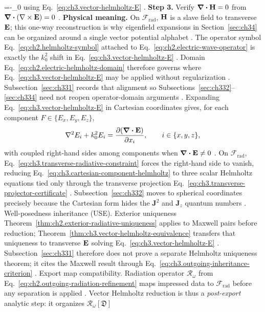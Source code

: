 =-\jj\omega\varepsilon_0\E\) using Eq.~\eqref{eq:ch3.vector-helmholtz-E} .
\textbf{Step 3.} Verify \(\div\mathbf{H}=0\) from \(\div(\nabla\times\mathbf{E})=0\) .
\textbf{Physical meaning.} On \(\mathcal{F}_{\mathrm{rad}}\), \(\mathbf{H}\) is a slave field to transverse \(\mathbf{E}\); this
one-way reconstruction is why eigenfield expansions in Section~\ref{sec:ch34} can be organized around a single
vector potential alphabet .
The operator symbol Eq.~\eqref{eq:ch2.helmholtz-symbol} attached to Eq.~\eqref{eq:ch2.electric-wave-operator}
is exactly the \(k_{0}^{2}\) shift in Eq.~\eqref{eq:ch3.vector-helmholtz-E} . Domain
Eq.~\eqref{eq:ch2.electric-helmholtz-domain} therefore governs where Eq.~\eqref{eq:ch3.vector-helmholtz-E} may
be applied without regularization . Subsection~\ref{sec:ch331} records that alignment so
Subsections~\ref{sec:ch332}--\ref{sec:ch334} need not reopen operator-domain arguments .
Expanding Eq.~\eqref{eq:ch3.vector-helmholtz-E} in Cartesian coordinates gives, for each component
\(F\in\{E_x,E_y,E_z\}\),
\begin{equation}
\label{eq:ch3.cartesian-component-helmholtz}
\nabla^{2}E_{i}+k_{0}^{2}E_{i}
=
\frac{\partial(\div\mathbf{E})}{\partial x_{i}},
\qquad
i\in\{x,y,z\},
\end{equation}
with coupled right-hand sides among components when \(\div\mathbf{E}\neq0\) . On
\(\mathcal{F}_{\mathrm{rad}}\), Eq.~\eqref{eq:ch3.transverse-radiative-constraint} forces the right-hand side to
vanish, reducing Eq.~\eqref{eq:ch3.cartesian-component-helmholtz} to three scalar Helmholtz equations tied only
through the transverse projection Eq.~\eqref{eq:ch3.transverse-projector-certificate} .
Subsection~\ref{sec:ch332} moves to spherical coordinates precisely because the Cartesian form hides the
\(\mathbf{J}^{2}\) and \(\mathbf{J}_{z}\) quantum numbers .
Well-posedness inheritance (USE). Exterior uniqueness Theorem~\ref{thm:ch2.exterior-radiative-uniqueness} applies to Maxwell pairs before
reduction; Theorem~\ref{thm:ch3.vector-helmholtz-equivalence} transfers that uniqueness to transverse
\(\mathbf{E}\) solving Eq.~\eqref{eq:ch3.vector-helmholtz-E} . Subsection~\ref{sec:ch331}
therefore does not prove a separate Helmholtz uniqueness theorem; it cites the Maxwell result through
Eq.~\eqref{eq:ch3.outgoing-inheritance-criterion} .
Export map compatibility. Radiation operator \(\mathcal{R}_\omega\) from Eq.~\eqref{eq:ch2.outgoing-radiation-refinement} maps impressed data
to \(\mathcal{F}_{\mathrm{rad}}\) before any separation is applied . Vector
Helmholtz reduction is thus a \emph{post-export} analytic step: it organizes \(\mathcal{R}_\omega[\mathfrak{D}]\)
